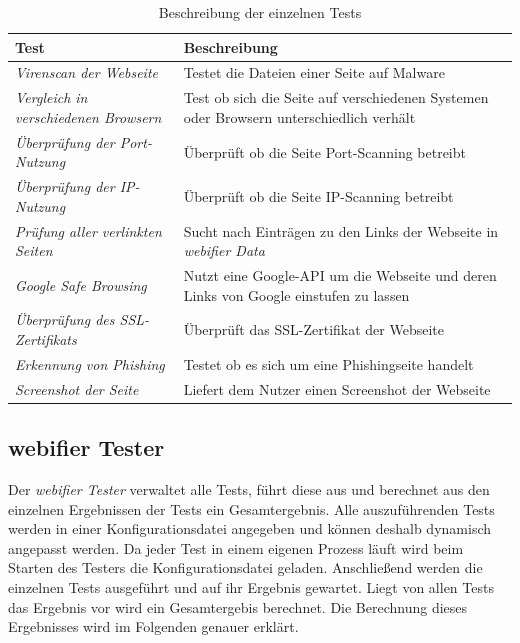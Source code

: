 \begin{table}[H]
\centering
\begin{tabularx}{\textwidth}{|l|X|}
\hline
\textbf{Test} & \textbf{Beschreibung} \\\hline
\textit{Virenscan der Webseite} & Testet die Dateien einer Seite auf Malware \\\hline
\textit{Vergleich in verschiedenen Browsern} & Test ob sich die Seite auf verschiedenen Systemen
oder Browsern unterschiedlich verhält \\\hline
\textit{Überprüfung der Port-Nutzung} & Überprüft ob die Seite Port-Scanning betreibt \\\hline
\textit{Überprüfung der IP-Nutzung} & Überprüft ob die Seite IP-Scanning betreibt \\\hline
\textit{Prüfung aller verlinkten Seiten} & Sucht nach Einträgen zu den Links der Webseite
in \textit{webifier Data} \\\hline
\textit{Google Safe Browsing} & Nutzt eine Google-API um die Webseite und deren Links von Google
einstufen zu lassen \\\hline
\textit{Überprüfung des SSL-Zertifikats} & Überprüft das \acs{SSL}-Zertifikat der Webseite \\\hline
\textit{Erkennung von Phishing} & Testet ob es sich um eine Phishingseite handelt \\\hline
\textit{Screenshot der Seite} & Liefert dem Nutzer einen Screenshot der Webseite \\\hline
\end{tabularx}
\caption{Beschreibung der einzelnen Tests}
\label{tbl:tests}
\end{table}

\subsection{webifier Tester}
\label{sec:konzept-tester}

Der \textit{webifier Tester} verwaltet alle Tests, führt diese aus und berechnet aus den einzelnen
Ergebnissen der Tests ein Gesamtergebnis. Alle auszuführenden Tests werden in einer
Konfigurationsdatei angegeben und können deshalb dynamisch angepasst werden. Da jeder Test in einem
eigenen Prozess läuft wird beim Starten des Testers die Konfigurationsdatei geladen. Anschließend
werden die einzelnen Tests ausgeführt und auf ihr Ergebnis gewartet. Liegt von allen Tests das
Ergebnis vor wird ein Gesamtergebis berechnet. Die Berechnung dieses Ergebnisses wird im Folgenden
genauer erklärt.

